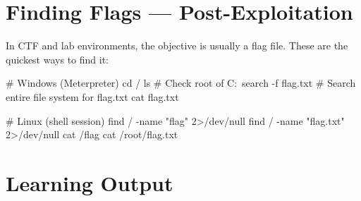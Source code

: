 
\section{Finding Flags --- Post-Exploitation}
\label{sec:finding_flags}

In CTF and lab environments, the objective is usually a flag file. These are
the quickest ways to find it:

\begin{termbox}
# Windows (Meterpreter)
cd /
ls                           # Check root of C:\
search -f flag.txt           # Search entire file system for flag.txt
cat flag.txt

# Linux (shell session)
find / -name "flag" 2>/dev/null
find / -name "flag.txt" 2>/dev/null
cat /flag
cat /root/flag.txt
\end{termbox}

\section{Learning Output}

